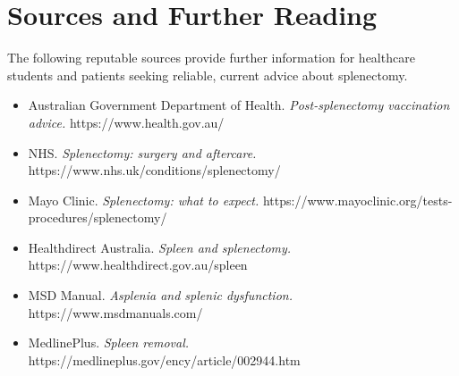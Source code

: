 \section*{Sources and Further Reading}
The following reputable sources provide further information for healthcare students and patients seeking reliable, current advice about splenectomy.
\begin{itemize}
    \item Australian Government Department of Health. \textit{Post-splenectomy vaccination advice.} https://www.health.gov.au/
    \item NHS. \textit{Splenectomy: surgery and aftercare.} https://www.nhs.uk/conditions/splenectomy/
    \item Mayo Clinic. \textit{Splenectomy: what to expect.} https://www.mayoclinic.org/tests-procedures/splenectomy/
    \item Healthdirect Australia. \textit{Spleen and splenectomy.} https://www.healthdirect.gov.au/spleen
    \item MSD Manual. \textit{Asplenia and splenic dysfunction.} https://www.msdmanuals.com/
    \item MedlinePlus. \textit{Spleen removal.} https://medlineplus.gov/ency/article/002944.htm
\end{itemize}
